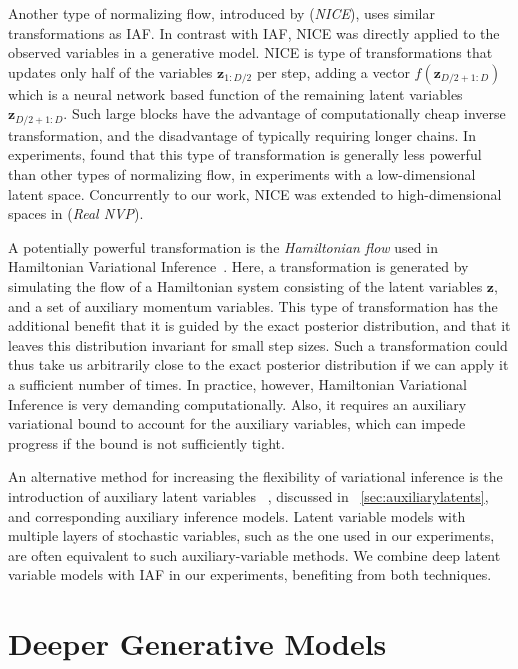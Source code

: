 \documentclass[MAL,biber]{nowfnt} %
\newcommand{\bb}[1]{\mathbf{#1}}
\newcommand{\bz}{\bb{z}}
\begin{document}
Another type of normalizing flow, introduced by \citep{dinh2014nice} (\emph{NICE}), uses similar transformations as IAF. In contrast with IAF, NICE was directly applied to the observed variables in a generative model. NICE is type of transformations that updates only half of the variables $\bz_{1:D/2}$ per step, adding a vector $f(\bz_{D/2+1:D})$ which is a neural network based function of the remaining latent variables $\bz_{D/2+1:D}$. Such large blocks have the advantage of computationally cheap inverse transformation, and the disadvantage of typically requiring longer chains. In experiments, \citep{rezende2015variational} found that this type of transformation is generally less powerful than other types of normalizing flow, in experiments with a low-dimensional latent space. Concurrently to our work, NICE was extended to high-dimensional spaces in \citep{dinh2016density} (\emph{Real NVP}).

A potentially powerful transformation is the \textit{Hamiltonian flow} used in Hamiltonian Variational Inference~\citep{salimans2015markov}. Here, a transformation is generated by simulating the flow of a Hamiltonian system consisting of the latent variables $\bz$, and a set of auxiliary momentum variables. This type of transformation has the additional benefit that it is guided by the exact posterior distribution, and that it leaves this distribution invariant for small step sizes. Such a transformation could thus take us arbitrarily close to the exact posterior distribution if we can apply it a sufficient number of times. In practice, however, Hamiltonian Variational Inference is very demanding computationally. Also, it requires an auxiliary variational bound to account for the auxiliary variables, which can impede progress if the bound is not sufficiently tight.

An alternative method for increasing the flexibility of variational inference is the introduction of auxiliary latent variables
~\citep{salimans2015markov,ranganath2016hierarchical,tran2015variational}, discussed in ~\ref{sec:auxiliarylatents}, and corresponding auxiliary inference models. Latent variable models with multiple layers of stochastic variables, such as the one used in our experiments, are often equivalent to such auxiliary-variable methods. We combine deep latent variable models with IAF in our experiments, benefiting from both techniques.

\chapter{Deeper Generative Models}
\label{chap:advanced_p}
\end{document}
